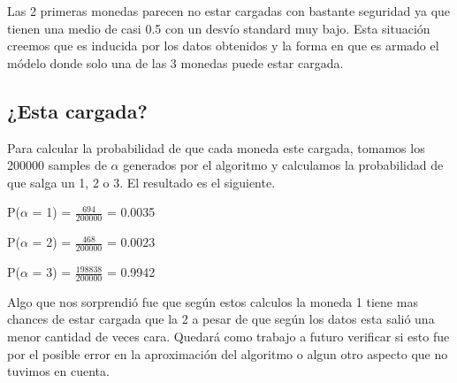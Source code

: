 Las 2 primeras monedas parecen no estar cargadas con bastante seguridad ya que tienen una medio de casi 0.5 con un desvío standard muy bajo. Esta situación creemos que es inducida por los datos obtenidos y la forma en que es armado el módelo donde solo una de las 3 monedas puede estar cargada.

\subsection{¿Esta cargada?}

Para calcular la probabilidad de que cada moneda este cargada, tomamos los 200000 samples de $\alpha$ generados por el algoritmo y calculamos la probabilidad de que salga un 1, 2 o 3. El resultado es el siguiente. 


P($\alpha$ = 1) = $\frac{694}{200000}$ = 0.0035

P($\alpha$ = 2) = $\frac{468}{200000}$ = 0.0023

P($\alpha$ = 3) = $\frac{198838}{200000}$ = 0.9942

Algo que nos sorprendió fue que según estos calculos la moneda 1 tiene mas chances de estar cargada que la 2 a pesar de que según los datos esta salió una menor cantidad de veces cara. Quedará como trabajo a futuro verificar si esto fue por el posible error en la aproximación del algoritmo o algun otro aspecto que no tuvimos en cuenta.